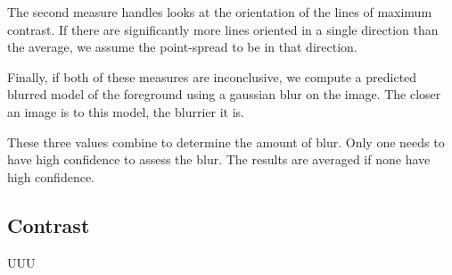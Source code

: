 \documentclass{article}
\begin{document}
The second measure handles looks at the orientation of the lines  of maximum contrast. If there are significantly more lines oriented in a single direction than the average, we assume the point-spread to be in that direction. %

Finally, if both of these measures are inconclusive, we compute a predicted blurred model of the foreground using a gaussian blur on the image. The closer an image is to this model, the blurrier it is.

These three values combine to determine the amount of blur. Only one needs to have high confidence to assess the blur. The results are averaged if none have high confidence.%


\subsection{Contrast}

UUU



\end{document}
